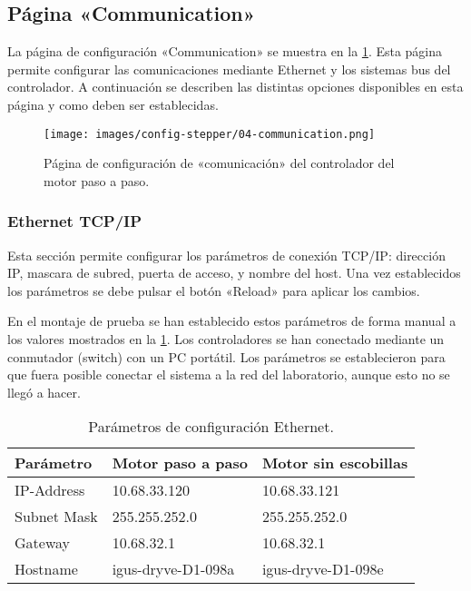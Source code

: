 \documentclass[english,spanish,a4paper,11pt]{article}
\begin{document}
\subsection{Página «Communication»}
\label{sec:page_communication}

La página de configuración «Communication» se muestra en la \cref{fig:conf_stepper_4}. Esta página permite configurar las comunicaciones mediante Ethernet y los sistemas bus del controlador. A continuación se describen las distintas opciones disponibles en esta página y como deben ser establecidas.

\begin{figure}[!ht]
    \centering
    \texttt{[image: images/config-stepper/04-communication.png]}
    \caption{Página de configuración de «comunicación» del controlador del motor paso a paso.}
    \label{fig:conf_stepper_4}
\end{figure}


\subsubsection{Ethernet TCP/IP}

Esta sección permite configurar los parámetros de conexión TCP/IP: dirección IP, mascara de subred, puerta de acceso, y nombre del host. Una vez establecidos los parámetros se debe pulsar el botón «Reload» para aplicar los cambios.

En el montaje de prueba se han establecido estos parámetros de forma manual a los valores mostrados en la \cref{tab:conf_ethernet}. Los controladores se han conectado mediante un conmutador (switch) con un PC portátil. Los parámetros se establecieron para que fuera posible conectar el sistema a la red del laboratorio, aunque esto no se llegó a hacer.

\begin{table}[!ht]
    \centering
    \begin{tabular}{lll}
        \toprule
        Parámetro &  Motor paso a paso & Motor sin escobillas \\
        \midrule
        IP-Address & 10.68.33.120 & 10.68.33.121 \\
        Subnet Mask & 255.255.252.0 & 255.255.252.0 \\ 
        Gateway & 10.68.32.1 & 10.68.32.1 \\
        Hostname & igus-dryve-D1-098a & igus-dryve-D1-098e \\
        \bottomrule
    \end{tabular}
    \caption{Parámetros de configuración Ethernet.}
    \label{tab:conf_ethernet}
\end{table}
\end{document}

